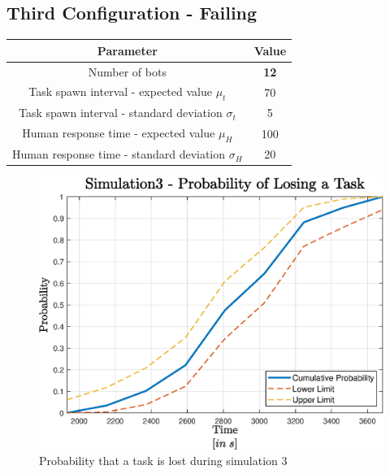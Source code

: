 \documentclass{article}
\begin{document}
		\subsection{Third Configuration - Failing}
			\label{sub:sim3}
			\begin{center}
				\begin{tabular}{ |c|c|}
					\hline
					Parameter & Value\\
					\hline
					\hline
					Number of bots & \textbf{12}\\
					\hline
					Task spawn interval - expected value $\mu_t$ & 70\\
					\hline					
					Task spawn interval - standard deviation $\sigma_t$ & 5\\
					\hline
					Human response time - expected value $\mu_H$ & 100\\
					\hline					
					Human response time - standard deviation $\sigma_H$ & 20\\
					\hline
				\end{tabular}
			\end{center}
			\begin{figure}[H]
				\centering
					\includegraphics[scale = 0.7]{Images/Simulation3}
					\caption{Probability that a task is lost during simulation 3}
					\label{fig:sim3}
			\end{figure}
\end{document}
